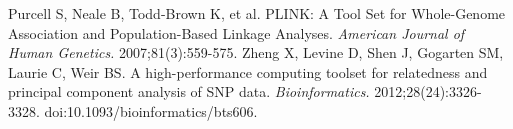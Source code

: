 \documentclass{article}
\begin{document}
\begin{thebibliography}{1}
 Purcell S, Neale B, Todd-Brown K, et al. {PLINK: A Tool Set for Whole-Genome Association and Population-Based Linkage Analyses. 
\em American Journal of Human Genetics.} 2007;81(3):559-575.
 Zheng X, Levine D, Shen J, Gogarten SM, Laurie C, Weir BS. {A high-performance computing toolset for relatedness and principal component analysis of SNP data. \em Bioinformatics.} 2012;28(24):3326-3328. doi:10.1093/bioinformatics/bts606.
\end{thebibliography}
\end{document}
